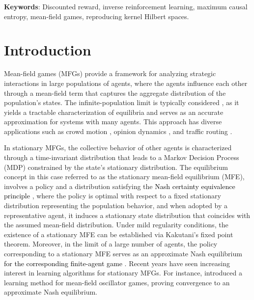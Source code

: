 \documentclass[11pt]{article}
\newcommand{\lk}[1]{\textcolor{black}{#1}} %
\begin{document}
\noindent\textbf{Keywords}: Discounted reward, inverse reinforcement learning, maximum causal entropy, mean-field games, reproducing kernel Hilbert spaces.

\section{Introduction}
\label{intro}

Mean-field games (MFGs) provide a framework for analyzing strategic interactions in large populations of agents, where the agents influence each other through a mean-field term that captures the aggregate distribution of the population's states. The infinite-population limit is typically considered \cite{HuMaCa06, LaLi07, BeFrPh13, CaDe13}, as it yields a tractable characterization of equilibria and serves as an accurate approximation for systems with many agents. This approach has diverse applications such as crowd motion \cite{7874135}, opinion dynamics \cite{BaTeBa2016}, and traffic routing \cite{9061051}.


In stationary MFGs, the collective behavior of other agents \cite{WeBeRo05} is characterized through a time-invariant distribution that leads to a Markov Decision Process (MDP) constrained by the state's stationary distribution. The equilibrium concept in this case referred to as the stationary mean-field equilibrium (MFE), involves a policy and a distribution satisfying the \lk{Nash certainty equivalence principle} \cite{HuMaCa06}, where the policy is optimal with respect to a fixed stationary distribution representing the population behavior, and when adopted by a representative agent, it induces a stationary state distribution that coincides with the assumed mean-field distribution. Under mild regularity conditions, the existence of a stationary MFE can be established via Kakutani's fixed point theorem. Moreover, in the limit of a large number of agents, the policy corresponding to a stationary MFE serves as an approximate Nash equilibrium \lk{for the corresponding finite-agent game} \cite{AdJoWe15}. Recent years have seen increasing interest in learning algorithms for stationary MFGs. For instance, \cite{YiMeMeSh14} introduced a learning method for mean-field oscillator games, proving convergence to an approximate Nash equilibrium.
\end{document}
